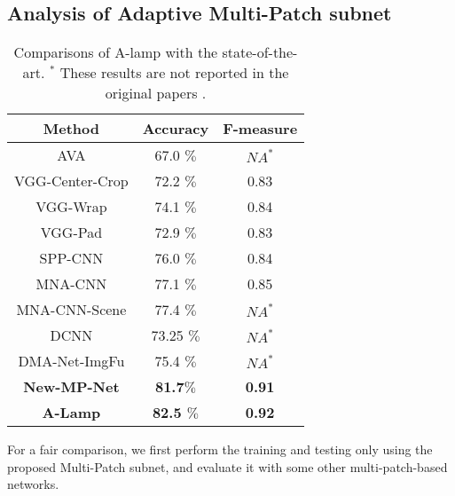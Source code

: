 \documentclass[10pt,twocolumn,letterpaper]{article}
\begin{document}
	\subsection{Analysis of Adaptive Multi-Patch subnet}
	\begin{table}
		\begin{center}
			\begin{tabular}{||c|c|c||} 
				\hline
				Method & Accuracy & F-measure\\
				\hline\hline
				AVA & 67.0 $\%$ & $N{A^ * }$  \\
				VGG-Center-Crop & 72.2 $\%$ & 0.83 \\
				VGG-Wrap & 74.1 $\%$ & 0.84 \\
				VGG-Pad & 72.9 $\%$ & 0.83 \\
				\hline
				SPP-CNN & 76.0 $\%$ & 0.84 \\
				MNA-CNN & 77.1 $\%$ & 0.85 \\
				MNA-CNN-Scene & 77.4 $\%$ & $N{A^ * }$ \\
				DCNN & 73.25 $\%$ & $N{A^ * }$ \\
				DMA-Net-ImgFu & 75.4 $\%$ & $N{A^ * }$\\
				\hline\hline
				\textbf{New-MP-Net} & \textbf{81.7$\% $} & \textbf{0.91} \\
				\textbf{A-Lamp} & \textbf{82.5 $\%$} & \textbf{0.92} \\
				\hline
			\end{tabular} 
		\end{center}
		\caption{Comparisons of A-lamp with the state-of-the-art. $^*$ These results are not reported in the original papers \cite{Lu:2015:ICCV,Lu:2014:TMM:rating,Mai:2016:CVPR,Murray:MMP2012:AVA}.}
		\label{tabel2}
		\vspace{-3mm}
	\end{table} 
	For a fair comparison, we first perform the training and testing only using the proposed Multi-Patch subnet, and evaluate it with some other multi-patch-based networks. 
	
\end{document}
